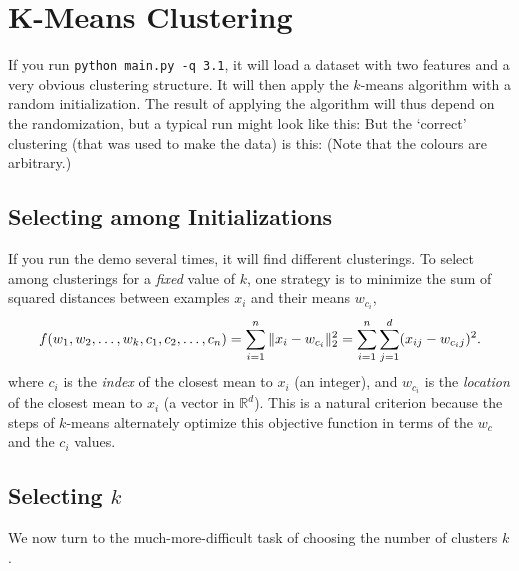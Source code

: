 \documentclass{article}
\begin{document}
\section{K-Means Clustering}

If you run \verb|python main.py -q 3.1|, it will load a dataset with two features and a very obvious clustering structure. It will then apply the $k$-means algorithm with a random initialization. The result of applying the algorithm will thus depend on the randomization, but a typical run might look like this:
But the `correct' clustering (that was used to make the data) is this:
(Note that the colours are arbitrary.)

\subsection{Selecting among Initializations}

If you run the demo several times, it will find different clusterings. To select among clusterings for a \emph{fixed} value of $k$, one strategy is to minimize the sum of squared distances between examples $x_i$ and their means $w_{c_i}$,
\[
f(w_1,w_2,\dots,w_k,c_1,c_2,\dots,c_n) = \sum_{i=1}^n \|x_i - w_{c_i}\|_2^2 = \sum_{i=1}^n \sum_{j=1}^d (x_{ij} - w_{c_ij})^2.
\]
 where $c_i$ is the \emph{index} of the closest mean to $x_i$ (an integer), and $w_{c_i}$ is the \emph{location} of the closest mean to $x_i$ (a vector in $\mathbb{R}^d$). This is a natural criterion because the steps of $k$-means alternately optimize this objective function in terms of the $w_c$ and the $c_i$ values.



 \subsection{Selecting $k$}

 We now turn to the much-more-difficult task of choosing the number of clusters $k$.
\end{document}
